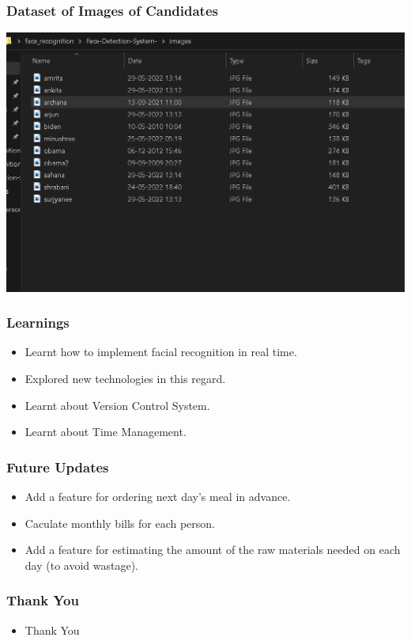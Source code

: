 \documentclass[12pt]{beamer}
\begin{document}
\begin{frame}  
  \frametitle{Dataset of Images of Candidates}      
      \begin {center}
         \includegraphics[scale=0.34]{data.png} 
      \end{center}   
\end{frame}   


\begin{frame}
    \frametitle{Learnings}
    \begin{itemize}          
        \item {Learnt how to implement facial recognition in real time.}
        \item{Explored new technologies in this regard.}
        \item{Learnt about Version Control System.}                    
        \item{Learnt about Time Management.}
    \end{itemize}       
\end{frame}

\begin{frame}
    \frametitle{Future Updates}
    \begin{itemize}          
        \item {Add a feature for ordering next day's meal in advance.}
        \item{Caculate monthly bills for each person. }                    
        \item{Add a feature for estimating the amount of the raw materials needed on each day (to avoid wastage).}
    \end{itemize}       
\end{frame}

\begin{frame}
    \frametitle{Thank You}
    \begin{itemize}           
        \item {Thank You}                    
    \end{itemize}     
      
\end{frame} 
\end{document}
